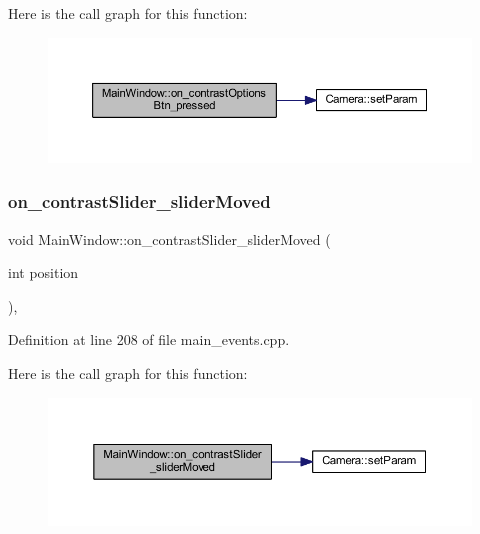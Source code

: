 Here is the call graph for this function\+:
\nopagebreak
\begin{figure}[H]
\begin{center}
\leavevmode
\includegraphics[width=350pt]{classMainWindow_a803bb81c63591b7f6c3306f712438378_cgraph}
\end{center}
\end{figure}
\mbox{\label{classMainWindow_ac9e59c581b41ab29cd61b41447cb74ef}} 
\subsubsection{\texorpdfstring{on\_contrastSlider\_sliderMoved}{on\_contrastSlider\_sliderMoved}}
{\footnotesize\ttfamily void Main\+Window\+::on\+\_\+contrast\+Slider\+\_\+slider\+Moved (\begin{DoxyParamCaption}\item[{int}]{position }\end{DoxyParamCaption})\hspace{0.3cm}{\ttfamily [private]}, {\ttfamily [slot]}}



Definition at line 208 of file main\+\_\+events.\+cpp.

Here is the call graph for this function\+:
\nopagebreak
\begin{figure}[H]
\begin{center}
\leavevmode
\includegraphics[width=350pt]{classMainWindow_ac9e59c581b41ab29cd61b41447cb74ef_cgraph}
\end{center}
\end{figure}
\mbox{\label{classMainWindow_ab98ee5c1e01d4db75d27e3f00c7c4b78}} 
